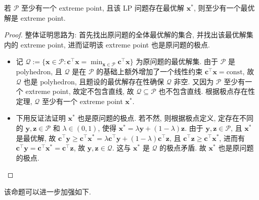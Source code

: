 \begin{thmblock}
若 $\mathcal{P}$ 至少有一个 extreme point, 且该 LP 问题存在最优解 $\bm{x}^*$, 则至少有一个最优解是 extreme point.


\begin{proof}{}
整体证明思路为: 首先找出原问题的全体最优解的集合, 并找出该最优解集内的 extreme point, 进而证明该 extreme point 也是原问题的极点.

\begin{itemize}
\item {}记 $\mathcal{Q} := \{\bm{x} \in \mathcal{P}: \bm{c}^\top \bm{x} = \min_{\bm{x} \in \mathcal{P}} \bm{c}^\top \bm{x}\}$ 为原问题的最优解集. 由于 $\mathcal{P}$ 是 polyhedron, 且 $\mathcal{Q}$ 是在 $\mathcal{P}$ 的基础上额外增加了一个线性约束 $\bm{c}^\top \bm{x} = \text{const}$, 故 $\mathcal{Q}$ 也是 polyhedron, 且题设的最优解存在性确保 $\mathcal{Q}$ 非空. 又因为 $\mathcal{P}$ 至少有一个 extreme point, 故定不包含直线, 故 $\mathcal{Q} \subseteq \mathcal{P}$ 也不包含直线. 根据极点存在性定理, $\mathcal{Q}$ 至少有一个 extreme point $\bm{x}^*$.


\item {}下用反证法证明 $\bm{x}^*$ 也是原问题的极点. 若不然, 则根据极点定义, 定存在不同的 $\bm{y}, \bm{z} \in \mathcal{P}$ 和 $\lambda \in (0, 1)$, 使得 $\bm{x}^* = \lambda \bm{y} + (1-\lambda) \bm{z}$. 由于 $\bm{y}, \bm{z} \in \mathcal{P}$, 且 $\bm{x}^*$ 是最优解, 故 $\bm{c}^\top \bm{y}  \geq \bm{c}^\top \bm{x}^* = \lambda \bm{c}^\top \bm{y} + (1-\lambda) \bm{c}^\top \bm{z}$, 且 $\bm{c}^\top \bm{z} \geq \bm{c}^\top \bm{x}^*$, 进而有 $\bm{c}^\top \bm{y} = \bm{c}^\top \bm{x}^* = \bm{c}^\top \bm{z}$, 故 $\bm{y}, \bm{z} \in \mathcal{Q}$. 这与 $\bm{x}^*$ 是 $\mathcal{Q}$ 的极点矛盾. 故 $\bm{x}^*$ 也是原问题的极点.


\end{itemize}

\end{proof}

\end{thmblock}

该命题可以进一步加强如下.


